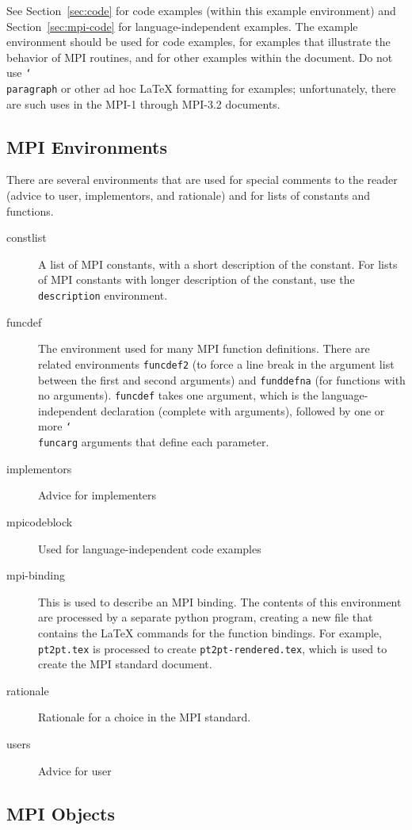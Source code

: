 \documentclass[letterpaper,twoside,11pt,fleqn]{article}
\def\cmd#1{\texttt{\char`\\#1}}
\def\MPI/{\textsf{MPI}}    %
\begin{document}
See Section~\ref{sec:code} for code examples (within this example
environment) and Section~\ref{sec:mpi-code} for language-independent
examples.
The example environment should be used for code examples, for
examples that illustrate the behavior of \MPI/ routines, and for other
examples within the document.
Do not use \cmd{paragraph} or other ad hoc LaTeX formatting for
examples; unfortunately, there are such uses in the \MPI/-1 through
\MPI/-3.2 documents.

\subsection{\texorpdfstring{\MPI/}{MPI} Environments}
\label{sec:mpi-envs}
There are several environments that are used for special comments to
the reader (advice to user, implementors, and rationale) and for lists
of constants and functions.
\begin{description}
\item[constlist]A list of \MPI/ constants, with a short description of the
  constant. For lists of \MPI/ constants with longer description of
  the constant, use the \texttt{description} environment.
\item[funcdef]The environment used for many \MPI/ function
  definitions.  There are related environments \texttt{funcdef2} (to
  force a line break in the argument list between the first and second
  arguments) and
  \texttt{funddefna} (for functions with no
  arguments). \texttt{funcdef} takes one argument, which is the
  language-independent declaration (complete with arguments), followed
  by one or more \cmd{funcarg} arguments that define each parameter.
\item[implementors]Advice for implementers
\item[mpicodeblock]Used for language-independent code examples
\item[mpi-binding]This is used to describe an MPI binding.  The
  contents of this environment are processed by a separate python
  program, creating a new file that contains the LaTeX commands for
  the function bindings.
  For example, \texttt{pt2pt.tex} is processed to create
  \texttt{pt2pt-rendered.tex}, which is used to create the \MPI/
  standard document.
\item[rationale]Rationale for a choice in the \MPI/ standard.
\item[users]Advice for user
\end{description}

\subsection{\texorpdfstring{\MPI/}{MPI} Objects}
\label{sec:objects}
\end{document}
